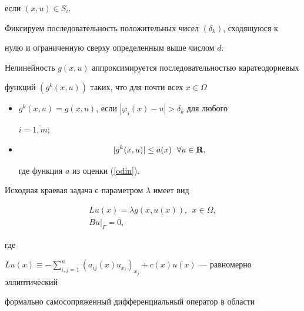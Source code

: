 если $(x,u)\in S_i$.





Фиксируем последовательность положительных чисел $(\delta_k)$, сходящуюся к


нулю и ограниченную сверху определенным выше числом $d$.





Нелинейность $g(x, u)$ аппроксимируется последовательностью каратеодориевых


функций $(g^k(x, u))$ таких, что для почти всех $x\in\Omega$


\begin{itemize}


\item[(i)] $g^k(x, u)=g(x, u)$, если $|\varphi_i(x)-u|>\delta_k$ для любого


$i=\overline{1, m}$;


\item[(ii)]


\begin{equation}


\label{tri}


|g^k(x, u)|\leq a(x) \ \; \forall u\in {\bold R},


\end{equation}


где функция $a$ из оценки (\ref{odin}).


\end{itemize}





Исходная краевая задача с параметром $\lambda$ имеет вид


\begin{gather}


\label{uravn}


Lu(x)=\lambda g(x, u(x)), \ \ x\in\Omega,\\


\label{gran}


Bu|_{ \Gamma}=0,


\end{gather}


где


$Lu(x)\equiv-\sum\limits_{i,j=1}^n {(a_{ij}(x)u_{x_i})}_{x_j}+


c(x)u(x)$ ---  равномерно эллиптический


формально самосопряженный дифференциальный оператор в области


